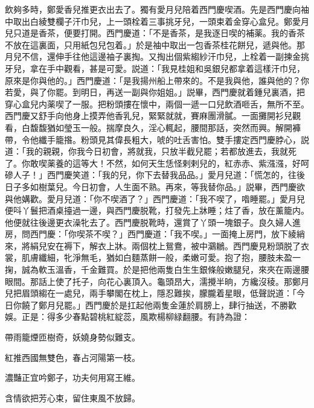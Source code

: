 飲夠多時，鄭愛香兒推更衣出去了。獨有愛月兒陪着西門慶喫酒。先是西門慶向袖中取出白綾雙欄子汗巾兒，上一頭栓着三事挑牙兒，一頭束着金穿心盒兒。鄭愛月兒只道是香茶，便要打開。西門慶道：「不是香茶，是我逐日喫的補薬。我的香茶不放在這裏面，只用紙包兒包着。」於是袖中取出一包香茶桂花餅兒，遞與他。那月兒不信，還伸手往他這邊袖子裏掏。又掏出個紫縐紗汗巾兒，上栓着一副揀金挑牙兒，拿在手中觀看，甚是可愛。説道：「我見桂姐和吳銀兒都拿着這樣汗巾兒，原來是你與他的。」西門慶道：「是我揚州船上帶來的。不是我與他，誰與他的？你若愛，與了你罷。到明日，再送一副與你姐姐。」説畢，西門慶就着鍾兒裏酒，把穿心盒兒内薬喫了一服。把粉頭摟在懷中，兩個一遞一口兒飲酒咂舌，無所不至。西門慶又舒手向他身上摸弄他香乳兒，緊緊就就，賽麻團滑膩。一面攤開衫兒觀看，白馥馥猶如瑩玉一般。揣摩良久，淫心輒起，腰間那話，突然而興。解開褲帶，令他纖手籠揝。粉頭見其偉長粗大，唬的吐舌害怕。雙手摟定西門慶脖心，説道：「我的親親，你我今日初會，將就我，只放半截兒罷；若都放進去，我就死了。你敢喫薬養的這等大！不然，如何天生恁怪剌剌兒的，紅赤赤、紫漒漒，好呵磣人子！」西門慶笑道：「我的兒，你下去替我品品。」愛月兒道：「慌怎的，往後日子多如樹葉兒。今日初會，人生面不熟。再來，等我替你品。」説畢，西門慶欲與他媾歡。愛月兒道：「你不喫酒了？」西門慶道：「我不喫了，喒睡罷。」愛月兒便呌丫鬟把酒桌擡過一邊，與西門慶脱靴，打發先上牀睡；炷了香，放在薰籠内。他便就往後邊更衣澡牝去了。西門慶脱靴時，還賞了丫頭一塊銀子。良久婦人進房，問西門慶：「你喫茶不喫？」西門慶道：「我不喫。」一面掩上房門，放下綾綃來，將絹兒安在褥下，解衣上牀。兩個枕上鴛鴦，被中鸂鶒。西門慶見粉頭脱了衣裳，肌膚纖細，牝淨無毛，猶如白麵蒸餅一般，柔嫩可愛。抱了抱，腰肢未盈一掬，誠為軟玉溫香，千金難買。於是把他兩隻白生生銀條般嫩腿兒，來夾在兩邊腰眼間。那話上使了托子，向花心裏頂入。龜頭昂大，濡攪半晌，方纔沒稜。那鄭月兒把眉頭縐在一處兒，兩手攀閣在枕上，隱忍難挨，朦朧着星眼，低聲説道：「今日你饒了鄭月兒罷。」西門慶於是扛起他兩隻金蓮於肩膀上，肆行抽送，不勝歡娛。正是：得多少春點碧桃紅綻蕊，風欺楊柳緑翻腰。有詩為證：

\begin{myquote}
帶雨籠煙匝樹奇，妖嬈身勢似難支。

紅推西國無雙色，春占河陽第一枝。

濃豔正宜吟鄭子，功夫何用寫王維。

含情欲把芳心束，留住東風不放歸。
\end{myquote}


